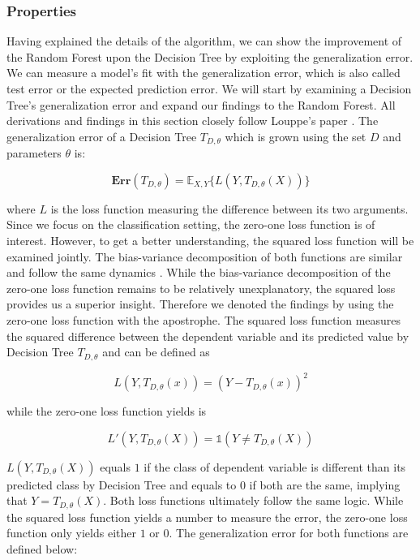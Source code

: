 \subsubsection{Properties}
Having explained the details of the algorithm, we can show the improvement of the Random Forest upon the Decision Tree 
by exploiting the generalization error.
We can measure a model's fit with the generalization error, which is also called test error or the expected prediction error.
We will start by examining a Decision Tree's generalization error and expand our findings to the Random Forest. 
All derivations and findings in this section closely follow Louppe's paper \cite{louppe2014understanding}.
The generalization error of a Decision Tree $T_{D,\theta}$ which is grown using the set $D$ and parameters $\theta$ is:

\begin{equation}
	\boldsymbol{Err}(T_{D,\theta}) = \mathbb{E}_{X,Y}\{L(Y, T_{D,\theta}(X)) \}
\end{equation}

where $L$ is the loss function measuring the difference between its two arguments. 
Since we focus on the classification setting, the zero-one loss function is of interest. 
However, to get a better understanding, the squared loss function will be examined jointly. 
The bias-variance decomposition of both functions are similar and 
follow the same dynamics \cite{domingos2000decomposition}. 
While the bias-variance decomposition of the zero-one loss function remains 
to be relatively unexplanatory, the squared loss provides us a superior insight. 
Therefore we denoted the findings by using the zero-one loss function with the apostrophe.
The squared loss function measures the squared difference between the dependent variable and its predicted value 
by Decision Tree $T_{D,\theta}$ and can be defined as

\begin{equation}
	L(Y, T_{D, \theta}(x)) = (Y - T_{D, \theta}(x))^2
\end{equation}

while the zero-one loss function yields is

\begin{equation}
	L'(Y, T_{D,\theta}(X)) = \mathds{1} (Y \neq T_{D, \theta}(X))
\end{equation}

$L(Y, T_{D,\theta}(X))$ equals $1$ if the class of dependent variable is 
different than its predicted class by Decision Tree and equals to 0 if both are the same, 
implying that $Y = T_{D, \theta}(X)$. 
Both loss functions ultimately follow the same logic.
While the squared loss function yields a number to measure the error, 
the zero-one loss function only yields either $1$ or $0$.
The generalization error for both functions are defined below:


